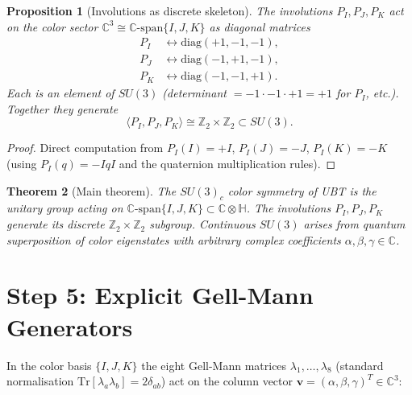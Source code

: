 \documentclass[12pt,a4paper]{article}
\newtheorem{theorem}{Theorem}[section]
\newtheorem{proposition}[theorem]{Proposition}
\theoremstyle{definition}
\theoremstyle{remark}
\begin{document}
\begin{proposition}[Involutions as discrete skeleton]
\label{prop:involutions_skeleton}
The involutions $P_I, P_J, P_K$ act on the color sector
$\mathbb{C}^3 \cong \mathbb{C}\text{-span}\{I,J,K\}$ as diagonal matrices
\begin{align*}
  P_I &\leftrightarrow \mathrm{diag}(+1, -1, -1), \\
  P_J &\leftrightarrow \mathrm{diag}(-1, +1, -1), \\
  P_K &\leftrightarrow \mathrm{diag}(-1, -1, +1).
\end{align*}
Each is an element of $SU(3)$ (determinant $= -1 \cdot -1 \cdot +1 = +1$ for
$P_I$, etc.).  Together they generate
\[
  \langle P_I, P_J, P_K \rangle \cong \mathbb{Z}_2 \times \mathbb{Z}_2
  \subset SU(3).
\]
\end{proposition}

\begin{proof}
Direct computation from $P_I(I) = +I$, $P_I(J) = -J$, $P_I(K) = -K$ (using
$P_I(q) = -IqI$ and the quaternion multiplication rules).
\end{proof}

\begin{theorem}[Main theorem]
\label{thm:main}
\emph{The $SU(3)_c$ color symmetry of UBT is the unitary group acting on
$\mathbb{C}\text{-span}\{I, J, K\} \subset \mathbb{C}\otimes\mathbb{H}$.
The involutions $P_I, P_J, P_K$ generate its discrete $\mathbb{Z}_2
\times \mathbb{Z}_2$ subgroup.  Continuous $SU(3)$ arises from quantum
superposition of color eigenstates with arbitrary complex coefficients
$\alpha, \beta, \gamma \in \mathbb{C}$.}
\end{theorem}

\section{Step 5: Explicit Gell-Mann Generators}
\label{sec:generators}

In the color basis $\{I, J, K\}$ the eight Gell-Mann matrices
$\lambda_1, \ldots, \lambda_8$ (standard normalisation
$\mathrm{Tr}[\lambda_a \lambda_b] = 2\delta_{ab}$) act on the column vector
$\mathbf{v} = (\alpha, \beta, \gamma)^T \in \mathbb{C}^3$:
\end{document}
